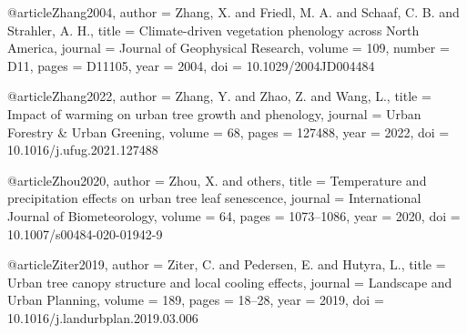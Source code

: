 @article{Zhang2004,
  author  = {Zhang, X. and Friedl, M. A. and Schaaf, C. B. and Strahler, A. H.},
  title   = {Climate-driven vegetation phenology across North America},
  journal = {Journal of Geophysical Research},
  volume  = {109},
  number  = {D11},
  pages   = {D11105},
  year    = {2004},
  doi     = {10.1029/2004JD004484}
}

@article{Zhang2022,
  author  = {Zhang, Y. and Zhao, Z. and Wang, L.},
  title   = {Impact of warming on urban tree growth and phenology},
  journal = {Urban Forestry \& Urban Greening},
  volume  = {68},
  pages   = {127488},
  year    = {2022},
  doi     = {10.1016/j.ufug.2021.127488}
}

@article{Zhou2020,
  author  = {Zhou, X. and others},
  title   = {Temperature and precipitation effects on urban tree leaf senescence},
  journal = {International Journal of Biometeorology},
  volume  = {64},
  pages   = {1073--1086},
  year    = {2020},
  doi     = {10.1007/s00484-020-01942-9}
}

@article{Ziter2019,
  author  = {Ziter, C. and Pedersen, E. and Hutyra, L.},
  title   = {Urban tree canopy structure and local cooling effects},
  journal = {Landscape and Urban Planning},
  volume  = {189},
  pages   = {18--28},
  year    = {2019},
  doi     = {10.1016/j.landurbplan.2019.03.006}
}
